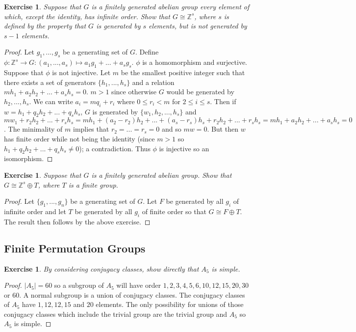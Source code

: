 \documentclass{article}
\newtheorem{exercise}[theorem]{Exercise}
\begin{document}
\begin{exercise}
Suppose that $G$ is a finitely generated abelian group every element of which, except the identity, has infinite order. Show that $G\cong\mathbb{Z}^s$, where $s$ is defined by the property that $G$ is generated by $s$ elements, but is not generated by $s-1$ elements.
\end{exercise}
\begin{proof}
Let $g_1,...,g_s$ be a generating set of $G$. Define $\phi:\mathbb{Z}^s\to G:(a_1,...,a_s)\mapsto a_1g_1+...+a_sg_s$. $\phi$ is a homomorphism and surjective. Suppose that $\phi$ is not injective. Let $m$ be the smallest positive integer such that there exists a set of generators $\{h_1,...,h_s\}$ and a relation $mh_1+a_2h_2+...+a_sh_s=0$. $m>1$ since otherwise $G$ would be generated by $h_2,...,h_s$. We can write $a_i=mq_i+r_i$ where $0\leq r_i<m$ for $2\leq i \leq s$. Then if $w=h_1+q_2h_2+...+q_sh_s$, $G$ is generated by $\{w_1,h_2,...,h_s\}$ and $mw_1+r_2h_2+...+r_sh_s=mh_1+(a_2-r_2)h_2+...+(a_s-r_s)h_s+r_2h_2+...+r_sh_s=mh_1+a_2h_2+...+a_sh_s=0$. The minimality of $m$ implies that $r_2=...=r_s=0$ and so $mw=0$. But then $w$ has finite order while not being the identity (since $m>1$ so $h_1+q_2h_2+...+q_sh_s\neq0$); a contradiction. Thus $\phi$ is injective so an isomorphism.
\end{proof}

\begin{exercise}
Suppose that $G$ is a finitely generated abelian group. Show that $G\cong \mathbb{Z}^s\oplus T$, where $T$ is a finite group.
\end{exercise}
\begin{proof}
Let $\{g_1,...,g_n\}$ be a generating set of $G$. Let $F$ be generated by all $g_i$ of infinite order and let $T$ be generated by all $g_i$ of finite order so that $G\cong F\oplus T$. The result then follows by the above exercise.
\end{proof}

\subsection{Finite Permutation Groups}
\begin{exercise}
By considering conjugacy classes, show directly that $A_5$ is simple.
\end{exercise}
\begin{proof}
$|A_5|=60$ so a subgroup of $A_5$ will have order $1,2,3,4,5,6,10,12,15,20,30$ or $60$. A normal subgroup is a union of conjugacy classes. The conjugacy classes of $A_5$ have $1,12,12,15$ and $20$ elements. The only possibility for unions of those conjugacy classes which include the trivial group are the trivial group and $A_5$ so $A_5$ is simple. 
\end{proof}
\end{document}
